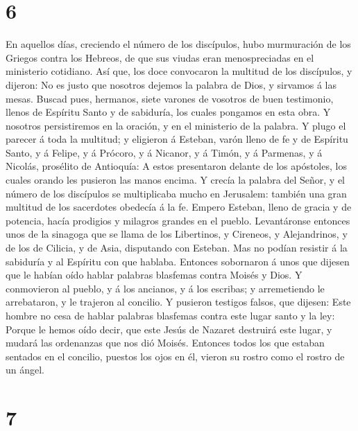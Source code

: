 \hypertarget{section-5}{%
\section{6}\label{section-5}}

 En aquellos días, creciendo el número de los discípulos,
hubo murmuración de los Griegos contra los Hebreos, de que sus viudas
eran menospreciadas en el ministerio cotidiano.  Así que,
los doce convocaron la multitud de los discípulos, y dijeron: No es
justo que nosotros dejemos la palabra de Dios, y sirvamos á las mesas.
 Buscad pues, hermanos, siete varones de vosotros de buen
testimonio, llenos de Espíritu Santo y de sabiduría, los cuales pongamos
en esta obra.  Y nosotros persistiremos en la oración, y
en el ministerio de la palabra.  Y plugo el parecer á toda
la multitud; y eligieron á Esteban, varón lleno de fe y de Espíritu
Santo, y á Felipe, y á Prócoro, y á Nicanor, y á Timón, y á Parmenas, y
á Nicolás, prosélito de Antioquía:  A estos presentaron
delante de los apóstoles, los cuales orando les pusieron las manos
encima.  Y crecía la palabra del Señor, y el número de los
discípulos se multiplicaba mucho en Jerusalem: también una gran multitud
de los sacerdotes obedecía á la fe.  Empero Esteban, lleno
de gracia y de potencia, hacía prodigios y milagros grandes en el
pueblo.  Levantáronse entonces unos de la sinagoga que se
llama de los Libertinos, y Cireneos, y Alejandrinos, y de los de
Cilicia, y de Asia, disputando con Esteban.  Mas no
podían resistir á la sabiduría y al Espíritu con que hablaba.
 Entonces sobornaron á unos que dijesen que le habían
oído hablar palabras blasfemas contra Moisés y Dios.  Y
conmovieron al pueblo, y á los ancianos, y á los escribas; y
arremetiendo le arrebataron, y le trajeron al concilio. 
Y pusieron testigos falsos, que dijesen: Este hombre no cesa de hablar
palabras blasfemas contra este lugar santo y la ley: 
Porque le hemos oído decir, que este Jesús de Nazaret destruirá este
lugar, y mudará las ordenanzas que nos dió Moisés. 
Entonces todos los que estaban sentados en el concilio, puestos los ojos
en él, vieron su rostro como el rostro de un ángel.

\hypertarget{section-6}{%
\section{7}\label{section-6}}

